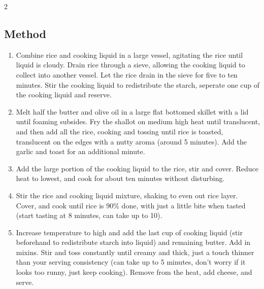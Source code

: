 \begin{multicols}{2}
  \subsection{Method}
    \begin{enumerate}
      \item Combine rice and cooking liquid in a large vessel, agitating the rice until liquid is cloudy. Drain rice through a sieve, allowing the cooking liquid to collect into another vessel. Let the rice drain in the sieve for five to ten minutes. Stir the cooking liquid to redistribute the starch, seperate one cup of the cooking liquid and reserve.
      \item Melt half the butter and olive oil in a large flat bottomed skillet with a lid until foaming subsides. Fry the shallot on medium high heat until translucent, and then add all the rice, cooking and tossing until rice is toasted, translucent on the edges with a nutty aroma (around 5 minutes). Add the garlic and toast for an additional minute.
      \item Add the large portion of the cooking liquid to the rice, stir and cover. Reduce heat to lowest, and cook for about ten minutes without disturbing.
      \item Stir the rice and cooking liquid mixture, shaking to even out rice layer. Cover, and cook until rice is 90\% done, with just a little bite when tasted (start tasting at 8 minutes, can take up to 10).
      \item Increase temperature to high and add the last cup of cooking liquid (stir beforehand to redistribute starch into liquid) and remaining butter. Add in mixins. Stir and toss constantly until creamy and thick, just a touch thinner than your serving consistency (can take up to 5 minutes, don’t worry if it looks too runny, just keep cooking). Remove from the heat, add cheese, and serve.
    \end{enumerate}
  \end{multicols}
